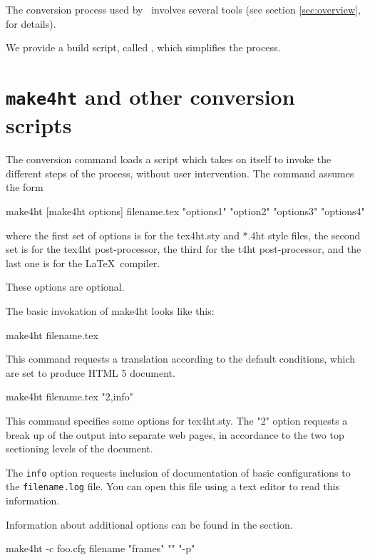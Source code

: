 The conversion process used by \texfourht\ involves several tools
(see section \ref{sec:overview},  for details). 


We provide a build script, called , which simplifies the 
process.


\section{\texttt{make4ht} and other conversion scripts}
\label{sec:make4ht-intro}

The conversion command loads a script which takes on itself to invoke the
different steps of the process, without user intervention. The command assumes
the form

\begin{shellcommand}
make4ht [make4ht options] filename.tex "options1" "option2" "options3" "options4"
\end{shellcommand}

where the first set of options is for the tex4ht.sty and *.4ht style files, the
second set is for the tex4ht post-processor, the third for the t4ht
post-processor, and the last one is for the \LaTeX\ compiler. 

These options are optional.

The basic invokation of make4ht looks like this:

\begin{shellcommand}
make4ht filename.tex
\end{shellcommand}

This command requests a translation according to the default conditions, which are set to produce HTML 5 document.

\begin{shellcommand}
make4ht filename.tex "2,info"
\end{shellcommand}

This command specifies some options for tex4ht.sty. The "2" option requests a
break up of the output into separate web pages, in accordance to the two top
sectioning levels of the document.

The \texttt{info} option requests inclusion of documentation of basic configurations to the \texttt{filename.log} file.
You can open this file using a text editor to read this information.

Information about additional options can be found in the  section.


\begin{shellcommand}
make4ht -c foo.cfg filename "frames" "" "-p"
\end{shellcommand}

